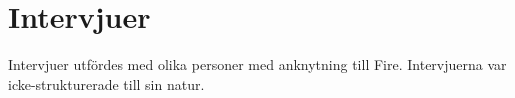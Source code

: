 \section{Intervjuer}

Intervjuer utfördes med olika personer med anknytning till Fire. Intervjuerna var icke-strukturerade till sin natur. 
